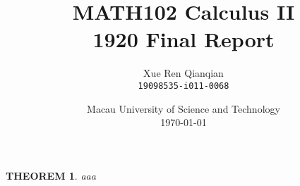 \documentclass{report}
\title{MATH102 Calculus II \\1920 Final Report} %
\author{Xue Ren Qianqian\\ \texttt{19098535-i011-0068}} %
\date{Macau University of Science and Technology \\\today} %
\newtheorem{theorem}{THEOREM}
\begin{document}
\maketitle %


\begin{theorem}
    aaa
\end{theorem}
\end{document}
